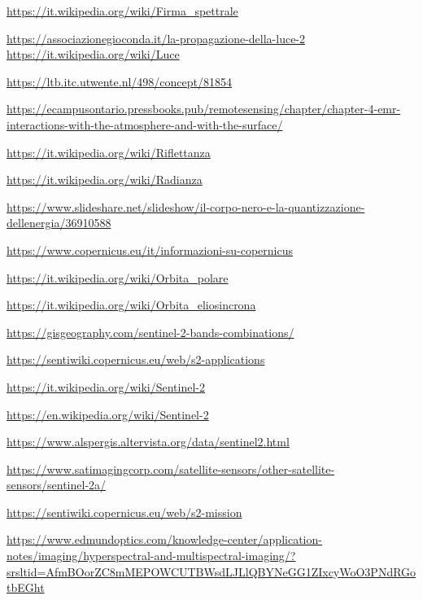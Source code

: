 \begin{thebibliography}{99}
\url{https://it.wikipedia.org/wiki/Firma_spettrale}

\url{https://associazionegioconda.it/la-propagazione-della-luce-2}
\url{https://it.wikipedia.org/wiki/Luce}

\url{https://ltb.itc.utwente.nl/498/concept/81854}

\url{https://ecampusontario.pressbooks.pub/remotesensing/chapter/chapter-4-emr-interactions-with-the-atmosphere-and-with-the-surface/}

\url{https://it.wikipedia.org/wiki/Riflettanza}

\url{https://it.wikipedia.org/wiki/Radianza}

\url{https://www.slideshare.net/slideshow/il-corpo-nero-e-la-quantizzazione-dellenergia/36910588}


\url{https://www.copernicus.eu/it/informazioni-su-copernicus}

\url{https://it.wikipedia.org/wiki/Orbita_polare}

\url{https://it.wikipedia.org/wiki/Orbita_eliosincrona}





\url{https://gisgeography.com/sentinel-2-bands-combinations/}

\url{https://sentiwiki.copernicus.eu/web/s2-applications}

\url{https://it.wikipedia.org/wiki/Sentinel-2}

\url{https://en.wikipedia.org/wiki/Sentinel-2}

\url{https://www.alspergis.altervista.org/data/sentinel2.html}

\url{https://www.satimagingcorp.com/satellite-sensors/other-satellite-sensors/sentinel-2a/}

\url{https://sentiwiki.copernicus.eu/web/s2-mission}


\url{https://www.edmundoptics.com/knowledge-center/application-notes/imaging/hyperspectral-and-multispectral-imaging/?srsltid=AfmBOorZC8mMEPOWCUTBWsdLJLlQBYNeGG1ZIxcyWoO3PNdRGotbEGht}


\end{thebibliography}
